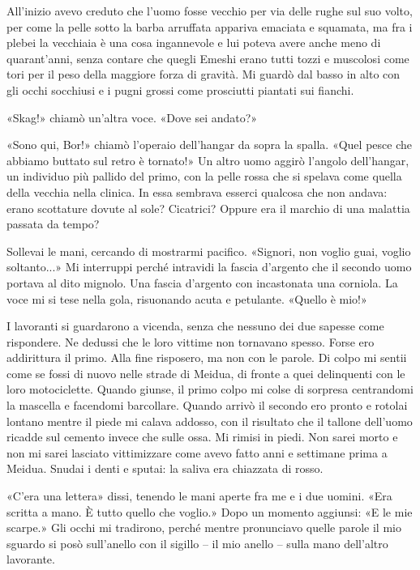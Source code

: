 All'inizio avevo creduto che l'uomo fosse vecchio per via delle rughe
sul suo volto, per come la pelle sotto la barba arruffata appariva
emaciata e squamata, ma fra i plebei la vecchiaia è una cosa ingannevole
e lui poteva avere anche meno di quarant'anni, senza contare che quegli
Emeshi erano tutti tozzi e muscolosi come tori per il peso della
maggiore forza di gravità. Mi guardò dal basso in alto con gli occhi
socchiusi e i pugni grossi come prosciutti piantati sui fianchi.

«Skag!» chiamò un'altra voce. «Dove sei andato?»

«Sono qui, Bor!» chiamò l'operaio dell'hangar da sopra la spalla. «Quel
pesce che abbiamo buttato sul retro è tornato!» Un altro uomo aggirò
l'angolo dell'hangar, un individuo più pallido del primo, con la pelle
rossa che si spelava come quella della vecchia nella clinica. In essa
sembrava esserci qualcosa che non andava: erano scottature dovute al
sole? Cicatrici? Oppure era il marchio di una malattia passata da tempo?

Sollevai le mani, cercando di mostrarmi pacifico. «Signori, non voglio
guai, voglio soltanto...» Mi interruppi perché intravidi la fascia
d'argento che il secondo uomo portava al dito mignolo. Una fascia
d'argento con incastonata una corniola. La voce mi si tese nella gola,
risuonando acuta e petulante. «Quello è mio!»

I lavoranti si guardarono a vicenda, senza che nessuno dei due sapesse
come rispondere. Ne dedussi che le loro vittime non tornavano spesso.
Forse ero addirittura il primo. Alla fine risposero, ma non con le
parole. Di colpo mi sentii come se fossi di nuovo nelle strade di
Meidua, di fronte a quei delinquenti con le loro motociclette. Quando
giunse, il primo colpo mi colse di sorpresa centrandomi la mascella e
facendomi barcollare. Quando arrivò il secondo ero pronto e rotolai
lontano mentre il piede mi calava addosso, con il risultato che il
tallone dell'uomo ricadde sul cemento invece che sulle ossa. Mi rimisi
in piedi. Non sarei morto e non mi sarei lasciato vittimizzare come
avevo fatto anni e settimane prima a Meidua. Snudai i denti e sputai: la
saliva era chiazzata di rosso.

«C'era una lettera» dissi, tenendo le mani aperte fra me e i due uomini.
«Era scritta a mano. È tutto quello che voglio.» Dopo un momento
aggiunsi: «E le mie scarpe.» Gli occhi mi tradirono, perché mentre
pronunciavo quelle parole il mio sguardo si posò sull'anello con il
sigillo -- il mio anello -- sulla mano dell'altro lavorante.

